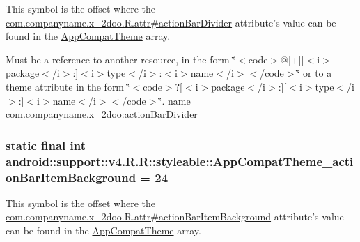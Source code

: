 This symbol is the offset where the \hyperlink{classcom_1_1companyname_1_1x__2doo_1_1_r_1_1attr_ca109af100863f17f49bd1104f978055}{com.companyname.x\_\-2doo.R.attr\#actionBarDivider} attribute's value can be found in the \hyperlink{classandroid_1_1support_1_1v4_1_1_r_1_1styleable_0873e92ba21076bb5a4aeadeb7f5779f}{AppCompatTheme} array.

Must be a reference to another resource, in the form \char`\"{}$<$code$>$@\mbox{[}+\mbox{]}\mbox{[}$<$i$>$package$<$/i$>$:\mbox{]}$<$i$>$type$<$/i$>$:$<$i$>$name$<$/i$>$$<$/code$>$\char`\"{} or to a theme attribute in the form \char`\"{}$<$code$>$?\mbox{[}$<$i$>$package$<$/i$>$:\mbox{]}\mbox{[}$<$i$>$type$<$/i$>$:\mbox{]}$<$i$>$name$<$/i$>$$<$/code$>$\char`\"{}.  name \hyperlink{namespacecom_1_1companyname_1_1x__2doo}{com.companyname.x\_\-2doo}:actionBarDivider \hypertarget{classandroid_1_1support_1_1v4_1_1_r_1_1styleable_2f97502dea4ecbf53eeb7b290f197fed}{
\subsubsection[{AppCompatTheme\_\-actionBarItemBackground}]{\setlength{\rightskip}{0pt plus 5cm}static final int android::support::v4.R.R::styleable::AppCompatTheme\_\-actionBarItemBackground = 24}}
\label{classandroid_1_1support_1_1v4_1_1_r_1_1styleable_2f97502dea4ecbf53eeb7b290f197fed}


This symbol is the offset where the \hyperlink{classcom_1_1companyname_1_1x__2doo_1_1_r_1_1attr_937f51d1561dde65a4bfec207141964b}{com.companyname.x\_\-2doo.R.attr\#actionBarItemBackground} attribute's value can be found in the \hyperlink{classandroid_1_1support_1_1v4_1_1_r_1_1styleable_0873e92ba21076bb5a4aeadeb7f5779f}{AppCompatTheme} array.

